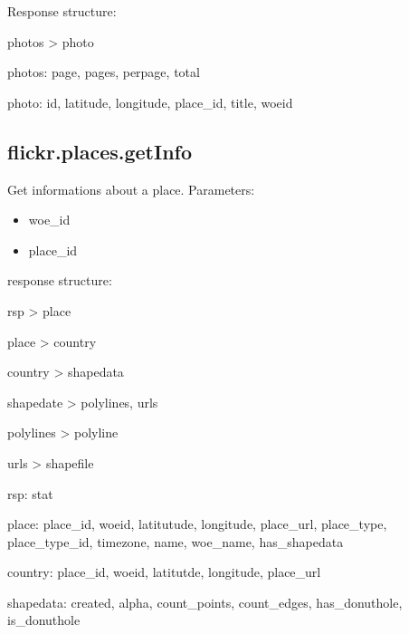 \documentclass[letterpaper,10pt,english]{sphinxmanual}
\begin{document}
Response structure:

\begin{DUlineblock}{0em}
\item[] photos \textgreater{} photo
\end{DUlineblock}

\begin{DUlineblock}{0em}
\item[] photos: page, pages, perpage, total
\item[] photo: id, latitude, longitude, place\_id, title, woeid
\end{DUlineblock}


\subsection{flickr.places.getInfo}
\label{main/flickr:flickr-places-getinfo}
Get informations about a place.
Parameters:
\begin{itemize}
\item {} 
woe\_id

\item {} 
place\_id

\end{itemize}

response structure:

\begin{DUlineblock}{0em}
\item[] rsp \textgreater{} place
\item[] place \textgreater{} country
\item[] country \textgreater{} shapedata
\item[] shapedate \textgreater{} polylines, urls
\item[] polylines \textgreater{} polyline
\item[] urls \textgreater{} shapefile
\end{DUlineblock}

\begin{DUlineblock}{0em}
\item[] rsp: stat
\item[] place: place\_id, woeid, latitutude, longitude, place\_url, place\_type, place\_type\_id, timezone, name, woe\_name, has\_shapedata
\item[] country: place\_id, woeid, latitutde, longitude, place\_url
\item[] shapedata: created, alpha, count\_points, count\_edges, has\_donuthole, is\_donuthole
\end{DUlineblock}
\end{document}
